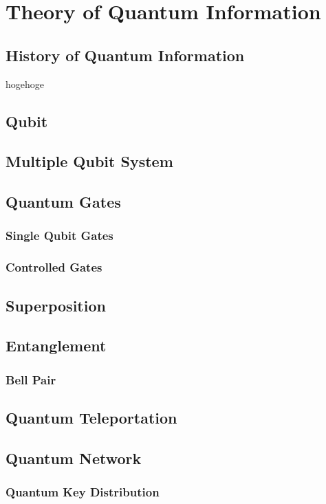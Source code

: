 \section{Theory of Quantum Information}
\label{theory_of_quantum_information}
\subsection{History of Quantum Information}
hogehoge
\subsection{Qubit}

\subsection{Multiple Qubit System}

\subsection{Quantum Gates}
\subsubsection{Single Qubit Gates}
\subsubsection{Controlled Gates}

\subsection{Superposition}

\subsection{Entanglement}
\subsubsection{Bell Pair}

\subsection{Quantum Teleportation}

\subsection{Quantum Network}
\subsubsection{Quantum Key Distribution}
